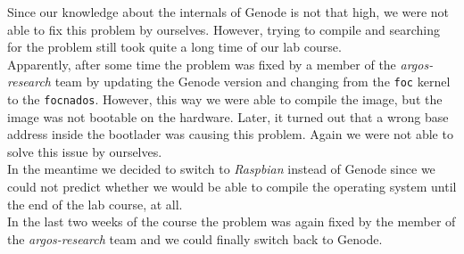 Since our knowledge about the internals of Genode is not that high, we were not able to fix this problem by ourselves. However, trying to compile and searching for the problem still took quite a long time of our lab course. \\

Apparently, after some time the problem was fixed by a member of the \textit{argos-research} team by updating the Genode version and changing from the \texttt{foc} kernel to the \texttt{focnados}. However, this way we were able to compile the image, but the image was not bootable on the hardware. Later, it turned out that a wrong base address inside the bootlader was causing this problem. Again we were not able to solve this issue by ourselves. \\

In the meantime we decided to switch to \textit{Raspbian} instead of Genode since we could not predict whether we would be able to compile the operating system until the end of the lab course, at all. \\

In the last two weeks of the course the problem was again fixed by the member of the \textit{argos-research} team and we could finally switch back to Genode.
